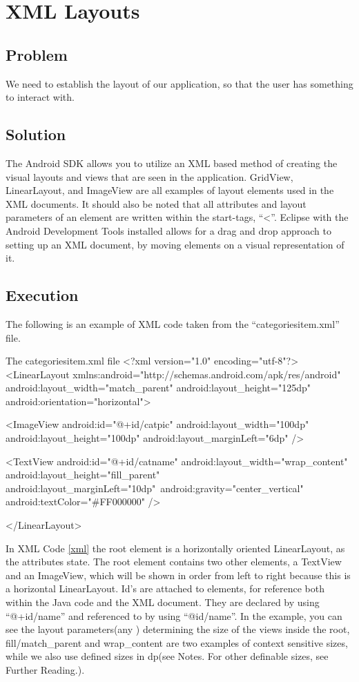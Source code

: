 \section{XML Layouts} %
\subsection*{Problem}
We need to establish the layout of our application, so that the user has something to interact with.
\subsection*{Solution}
The Android SDK allows you to utilize an XML based method of creating the visual layouts and views that are seen in the application.
GridView, LinearLayout, and ImageView are all examples of layout elements used in the XML documents.
It should also be noted that all attributes and layout parameters of an element are written within the start-tags, ``<''.
Eclipse with the Android Development Tools installed allows for a drag and drop approach to setting up an XML document, by moving elements on a visual representation of it.

\subsection*{Execution}
The following is an example of XML code taken from the ``categoriesitem.xml'' file.

\begin{xml}[{xml}]{The categoriesitem.xml file}
<?xml version="1.0" encoding="utf-8"?>
<LinearLayout xmlns:android="http://schemas.android.com/apk/res/android"
    android:layout_width="match_parent"
    android:layout_height="125dp"
    android:orientation="horizontal">

    <ImageView
        android:id="@+id/catpic"
        android:layout_width="100dp"
        android:layout_height="100dp"
        android:layout_marginLeft="6dp" />

    <TextView
        android:id="@+id/catname"
        android:layout_width="wrap_content"
        android:layout_height="fill_parent"
        android:layout_marginLeft="10dp"\
        android:gravity="center_vertical"
        android:textColor="#FF000000" />

</LinearLayout>
\end{xml}

In XML Code \ref{xml} the root element is a horizontally oriented LinearLayout, as the attributes state.
The root element contains two other elements, a TextView and an ImageView, which will be shown in order from left to right because this is a horizontal LinearLayout.
Id's are attached to elements, for reference both within the Java code and the XML document. They are declared by using ``@+id/name'' and referenced to by using ``@id/name''.\newline 
In the example, you can see the layout parameters(any ) determining the size of the views inside the root, fill/match\_parent and wrap\_content are two examples of context sensitive sizes, while we also use defined sizes in dp(see Notes. For other definable sizes, see Further Reading.). \\

